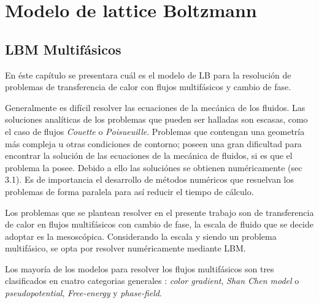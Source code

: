 \chapter{Modelo de lattice Boltzmann}

\graphicspath{{figs/cap2/}}
\label{cap2}

\section{LBM Multifásicos}

En éste capítulo se presentara cuál es el modelo de LB para la resolución de problemas de transferencia de calor con flujos multifásicos y cambio de fase.

Generalmente es difícil resolver las ecuaciones de la mecánica de los fluidos. Las soluciones analíticas de los problemas que pueden ser halladas son escasas, como el caso de flujos \textit{Couette} o \textit{Poisueuille}. Problemas que contengan una geometría más compleja u otras condiciones de contorno; poseen una gran dificultad para encontrar la solución de las ecuaciones de la mecánica de fluidos, si es que el problema la posee. Debido a ello las soluciónes se obtienen numéricamente \cite{kruger2017lattice}(sec 3.1). Es de importancia el desarrollo de métodos numéricos que resuelvan los problemas de forma paralela para así reducir el tiempo de cálculo.

Los problemas que se plantean resolver en el presente trabajo son de transferencia de calor en flujos multifásicos con cambio de fase, la escala de fluido que se decide adoptar es la mesoscópica. Considerando la escala y siendo un problema multifásico, se opta por resolver numéricamente mediante LBM. 


Los mayoría de los modelos para resolver los flujos multifásicos son tres clasificados en cuatro categorias generales : \textit{color gradient}, \textit{Shan Chen model} o \textit{pseudopotential}, \textit{Free-energy} y  \textit{phase-field}. 


